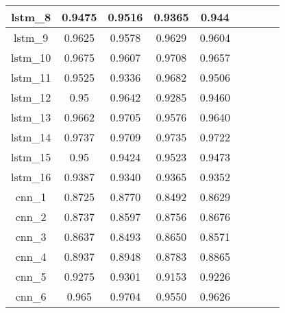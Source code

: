 \begin{table}[h]
\begin{tabular} {|c|c|c|c|c|c|c|c|c| }
        lstm\_8  & 0.9475                       & 0.9516                     & 0.9365                     & 0.944                      \\ \hline
        lstm\_9  & 0.9625                       & 0.9578                     & 0.9629                     & 0.9604                     \\ \hline
        lstm\_10 & 0.9675                       & 0.9607                     & 0.9708                     & 0.9657                     \\ \hline
        lstm\_11 & 0.9525                       & 0.9336                     & 0.9682                     & 0.9506                     \\ \hline
        lstm\_12 & 0.95                         & 0.9642                     & 0.9285                     & 0.9460                     \\ \hline
        lstm\_13 & 0.9662                       & 0.9705                     & 0.9576                     & 0.9640                     \\ \hline
        lstm\_14 & 0.9737                       & 0.9709                     & 0.9735                     & 0.9722                     \\ \hline
        lstm\_15 & 0.95                         & 0.9424                     & 0.9523                     & 0.9473                     \\ \hline
        lstm\_16 & 0.9387                       & 0.9340                     & 0.9365                     & 0.9352                     \\ \hline
        cnn\_1   & 0.8725                       & 0.8770                     & 0.8492                     & 0.8629                     \\ \hline
        cnn\_2   & 0.8737                       & 0.8597                     & 0.8756                     & 0.8676                     \\ \hline
        cnn\_3   & 0.8637                       & 0.8493                     & 0.8650                     & 0.8571                     \\ \hline
        cnn\_4   & 0.8937                       & 0.8948                     & 0.8783                     & 0.8865                     \\ \hline
        cnn\_5   & 0.9275                       & 0.9301                     & 0.9153                     & 0.9226                     \\ \hline
        cnn\_6   & 0.965                        & 0.9704                     & 0.9550                     & 0.9626                     \\ \hline

\end{tabular}
\end{table}
